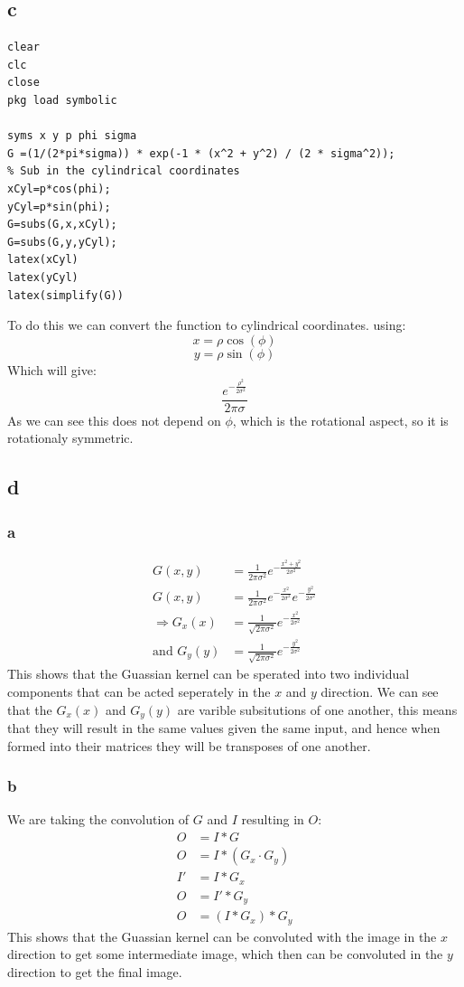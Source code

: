 \documentclass[11pt]{article}
\begin{document}
\subsection{c}
\label{sec:org777e820}
\begin{verbatim}
clear
clc
close
pkg load symbolic

syms x y p phi sigma
G =(1/(2*pi*sigma)) * exp(-1 * (x^2 + y^2) / (2 * sigma^2));
% Sub in the cylindrical coordinates
xCyl=p*cos(phi);
yCyl=p*sin(phi);
G=subs(G,x,xCyl);
G=subs(G,y,yCyl);
latex(xCyl)
latex(yCyl)
latex(simplify(G))
\end{verbatim}
To do this we can convert the function to cylindrical coordinates. using:
\[x= \rho \cos{\left(\phi \right)}\]
\[y= \rho \sin{\left(\phi \right)}\]
Which will give:
\[\frac{e^{- \frac{\rho^{2}}{2 \sigma^{2}}}}{2 \pi \sigma}\]
As we can see this does not depend on \(\phi\), which is the rotational aspect, so it is rotationaly symmetric.
\subsection{d}
\label{sec:org5c77696}
\subsubsection{a}
\label{sec:org63987d5}
\begin{align*}
G(x,y)&=\frac{1}{2\pi \sigma^{2}}e^{-\frac{x^2+y^2}{2 \sigma^2}} \\
G(x,y)&=\frac{1}{2\pi \sigma^{2}}e^{-\frac{x^2}{2 \sigma^2}}e^{-\frac{y^2}{2 \sigma^2}} \\
\Rightarrow G_x(x)&=\frac{1}{\sqrt{2\pi \sigma^{2}}}e^{-\frac{x^2}{2 \sigma^2}} \\
\textrm{and } G_y(y)&=\frac{1}{\sqrt{2\pi \sigma^{2}}}e^{-\frac{y^2}{2 \sigma^2}}
\end{align*}
This shows that the Guassian kernel can be sperated into two individual components that can be acted seperately in the \(x\) and \(y\) direction. We can see that the \(G_x(x)\) and \(G_y(y)\) are varible subsitutions of one another, this means that they will result in the same values given the same input, and hence when formed into their matrices they will be transposes of one another.
\subsubsection{b}
\label{sec:org80c4afc}
We are taking the convolution of \(G\) and \(I\) resulting in \(O\):
\begin{align*}
O&=I*G                     \\
O&=I*(G_x\cdot G_y)        \\
I'&=I*G_x                  \\
O&=I'* G_y                 \\
O&=(I*G_x)*G_y
\end{align*}
This shows that the Guassian kernel can be convoluted with the image in the \(x\) direction to get some intermediate image, which then can be convoluted in the \(y\) direction to get the final image.
\end{document}

